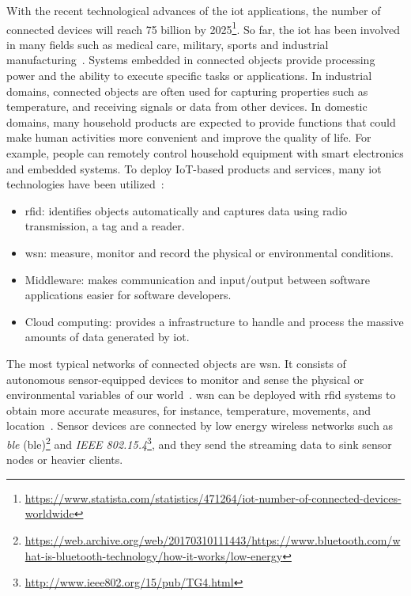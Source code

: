 With the recent technological advances of the \acrfull{iot} applications, the
number of connected devices will reach 75 billion by
2025\footnote{\url{https://www.statista.com/statistics/471264/iot-number-of-connected-devices-worldwide}}.
So far, the \acrshort{iot} has been involved in many fields such as medical
care, military, sports and industrial
manufacturing~\cite{boudargham2017exhaustive, lai2013survey, da2014internet}.
Systems embedded in connected objects provide processing power and the ability
to execute specific tasks or applications. In industrial domains, connected
objects are often used for capturing properties such as temperature, and
receiving signals or data from other devices. In domestic domains, many
household products are expected to provide functions that could make human
activities more convenient and improve the quality of life. For example, people
can remotely control household equipment with smart electronics and embedded
systems. To deploy IoT-based products and services, many \acrshort{iot}
technologies have been utilized~\cite{lee2015internet}:
\begin{itemize}
    \item \acrfull{rfid}: identifies objects automatically
    and captures data using radio transmission, a tag and a reader.
    \item \acrfull{wsn}: measure, monitor and record the physical
    or environmental conditions. 
    \item Middleware: makes communication and input/output between software applications easier for software
    developers.
    \item Cloud computing: provides a infrastructure to handle and process the massive
    amounts of data generated by \acrshort{iot}.
\end{itemize}

The most typical networks of connected objects are \acrlong{wsn}. It
consists of autonomous sensor-equipped devices to monitor and sense the physical
or environmental variables of our world~\cite{lee2015internet, li2016temporal}.
\acrshort{wsn} can be deployed with \acrshort{rfid} systems to obtain more
accurate measures, for instance, temperature, movements, and
location~\cite{lee2015internet, atzori2010b}. Sensor devices are connected by
low energy wireless networks such as \emph{\acrlong{ble}}
(\acrshort{ble})\footnote{\url{https://web.archive.org/web/20170310111443/https://www.bluetooth.com/what-is-bluetooth-technology/how-it-works/low-energy}}
and \emph{IEEE 802.15.4}\footnote{\url{http://www.ieee802.org/15/pub/TG4.html}},
and they send the streaming data to sink sensor nodes or heavier clients.

